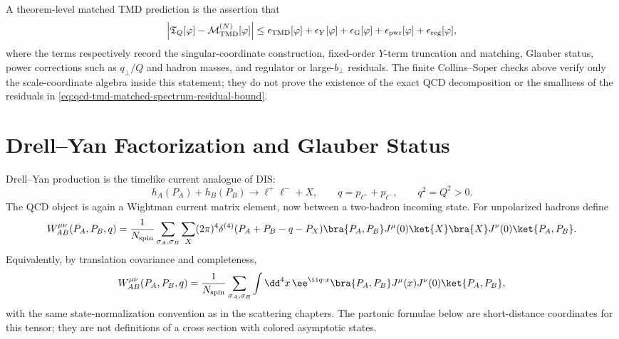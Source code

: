 \begin{controlledapproximation}
A theorem-level matched TMD prediction is the assertion that
\begin{equation}
  \left|
  \mathfrak T_Q[\varphi]
  -
  \mathcal M_{\rm TMD}^{(N)}[\varphi]
  \right|
  \le
  \epsilon_{\rm TMD}[\varphi]
  +\epsilon_Y[\varphi]
  +\epsilon_{\rm G}[\varphi]
  +\epsilon_{\rm pwr}[\varphi]
  +\epsilon_{\rm reg}[\varphi],
  \label{eq:qcd-tmd-matched-spectrum-residual-bound}
\end{equation}
where the terms respectively record the singular-coordinate construction,
fixed-order \(Y\)-term truncation and matching, Glauber status, power
corrections such as \(q_\perp/Q\) and hadron masses, and regulator or
large-\(b_\perp\) residuals.  The finite Collins--Soper checks above verify only
the scale-coordinate algebra inside this statement; they do not prove the
existence of the exact QCD decomposition or the smallness of the residuals in
\eqref{eq:qcd-tmd-matched-spectrum-residual-bound}.
\end{controlledapproximation}

\section{Drell--Yan Factorization and Glauber Status}
\label{sec:qcd-drell-yan-glauber-status}

Drell--Yan production is the timelike current analogue of DIS:
\[
  h_A(P_A)+h_B(P_B)\longrightarrow \ell^+\ell^-+X,
  \qquad q=p_{\ell^+}+p_{\ell^-},
  \qquad q^2=Q^2>0 .
\]
The QCD object is again a Wightman current matrix element, now between a
two-hadron incoming state.  For unpolarized hadrons define
\begin{equation}
  W_{AB}^{\mu\nu}(P_A,P_B,q)
  =
  \frac1{N_{\rm spin}}
  \sum_{\sigma_A,\sigma_B}
  \sum_X
  (2\pi)^4\delta^{(4)}(P_A+P_B-q-P_X)
  \bra{P_A,P_B}J^\mu(0)\ket{X}
  \bra{X}J^\nu(0)\ket{P_A,P_B}.
  \label{eq:qcd-drell-yan-hadronic-tensor}
\end{equation}
Equivalently, by translation covariance and completeness,
\begin{equation}
  W_{AB}^{\mu\nu}(P_A,P_B,q)
  =
  \frac1{N_{\rm spin}}
  \sum_{\sigma_A,\sigma_B}
  \int\dd^4x\,\ee^{\ii q\cdot x}
  \bra{P_A,P_B}J^\mu(x)J^\nu(0)\ket{P_A,P_B},
  \label{eq:qcd-drell-yan-current-product}
\end{equation}
with the same state-normalization convention as in the scattering chapters.
The partonic formulae below are short-distance coordinates for this tensor;
they are not definitions of a cross section with colored asymptotic states.

